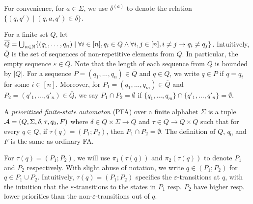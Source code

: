 For convenience, for $a \in \Sigma$, we use $\delta^{(a)}$ to denote the  relation $\{(q, q') \mid (q, a, q') \in \delta\}$.

%
For a finite set $Q$, let $\overline{Q} = \bigcup_{n\in \mathbb{N}}\{ (q_1, \ldots, q_n) \mid \forall i \in [n], q_i \in Q \wedge \forall i,j \in[n], i \neq j \rightarrow q_i \neq q_j \}$. Intuitively, $\overline{Q}$ is the set of sequences of non-repetitive elements from $Q$. In particular, the empty sequence $\varepsilon \in \overline{Q}$. Note that the length of each sequence from $\overline{Q}$ is bounded by  $| Q |$. For a sequence $P = (q_1, \ldots, q_n) \in \overline{Q}$ and  $q \in Q$, we write $q \in P$ if  $q = q_i$ for some $i \in [n]$. Moreover, for $P_1 = (q_1, \ldots, q_m) \in \overline{Q}$ and $P_2 = (q'_1, \ldots, q'_n) \in \overline{Q}$, we say $P_1 \cap P_2 = \emptyset$ if $\{q_1, \ldots, q_m\} \cap \{q'_1, \ldots, q'_n\} = \emptyset$.

\begin{definition}\label{def-pfa}
  A \emph{prioritized finite-state automaton} (PFA) over a finite alphabet $\Sigma$ is a tuple $\mathcal{A}=(Q, \Sigma, \delta, \tau, q_0, F)$ where $\delta \in Q
  \times \Sigma \rightarrow \overline{Q}$ and $\tau \in Q \rightarrow \overline{Q} \times \overline{Q}$ such that for every $q \in Q$, if $\tau(q) = (P_1; P_2)$, then $P_1 \cap P_2 = \emptyset$. 
  The definition of $Q$, $q_0$ and $F$ is the same as ordinary FA.
\end{definition}
For $\tau(q) = (P_1; P_2)$, we will use $\pi_1(\tau(q))$ and $\pi_2(\tau(q))$ to denote $P_1$ and $P_2$ respectively.  With slight abuse of notation, we write $q\in (P_1; P_2)$ for $q\in P_1\cup P_2$. Intuitively, $\tau(q)=(P_1; P_2)$ specifies the $\varepsilon$-transitions at $q$, with the intuition that the $\varepsilon$-transitions to the states in $P_1$ resp. $P_2$ have higher resp. lower priorities than the non-$\varepsilon$-transitions out of $q$.
  
